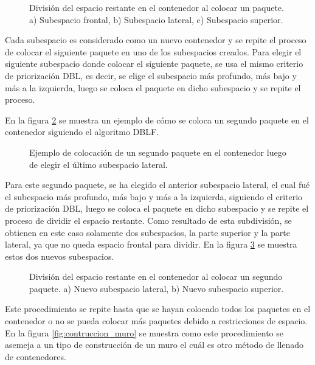 \documentclass[openany]{article}
\begin{document}
\begin{figure}[H]
    \centering
    
    \caption{División del espacio restante en el contenedor al colocar un paquete. a) Subespacio frontal, b) Subespacio lateral, c) Subespacio superior.}
    \label{fig:subespacios}
\end{figure}

Cada subespacio es considerado como un nuevo contenedor y se repite el proceso de colocar el siguiente paquete en uno de los subespacios creados. Para elegir el siguiente subespacio donde colocar el siguiente paquete, se usa el mismo criterio de priorización DBL, es decir, se elige el subespacio más profundo, más bajo y más a la izquierda, luego se coloca el paquete en dicho subespacio y se repite el proceso.

En la figura \ref{fig:segundo_paquete} se muestra un ejemplo de cómo se coloca un segundo paquete en el contenedor siguiendo el algoritmo DBLF.

\begin{figure}[H]
    \centering
    
    \caption{Ejemplo de colocación de un segundo paquete en el contenedor luego de elegir el último subespacio lateral.}
    \label{fig:segundo_paquete}
\end{figure}

Para este segundo paquete, se ha elegido el anterior subespacio lateral, el cual fué el subespacio más profundo, más bajo y más a la izquierda, siguiendo el criterio de priorización DBL, luego se coloca el paquete en dicho subespacio y se repite el proceso de dividir el espacio restante. Como resultado de esta subdivisión, se obtienen en este caso solamente dos subespacios, la parte superior y la parte lateral, ya que no queda espacio frontal para dividir. En la figura \ref{fig:segundos_subespacios} se muestra estos dos nuevos subespacios.

\begin{figure}[H]
    \centering
    
    \caption{División del espacio restante en el contenedor al colocar un segundo paquete. a) Nuevo subespacio lateral, b) Nuevo subespacio superior.}
    \label{fig:segundos_subespacios}
\end{figure}

Este procedimiento se repite hasta que se hayan colocado todos los paquetes en el contenedor o no se pueda colocar más paquetes debido a restricciones de espacio. En la figura \ref{fig:contruccion_muro} se muestra como este procedimiento se asemeja a un tipo de construcción de un muro el cuál es otro método de llenado de contenedores.
\end{document}
